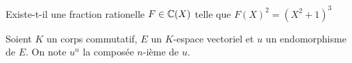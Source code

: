 \documentclass[french]{report}
\begin{document}
\begin{exo}
    Existe-t-il une fraction rationelle \(F\in\mathbb{C}(X)\) telle que
    \(F(X)^2=\left(X^2+1\right)^3\)
\end{exo}

\begin{exo}
    Soient \(K\) un corps commutatif, \(E\) un \(K\)-espace vectoriel et \(u\) un
    endomorphisme de \(E\). On note \(u^n\) la composée \(n\)-ième de \(u\).
\end{exo}
\end{document}
